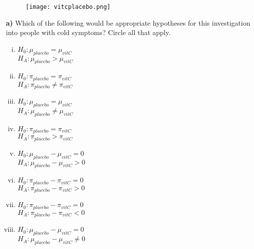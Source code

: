 \documentclass[12pt, oneside]{article}
\newcommand{\noi}{\noindent}
\begin{document}
\begin{figure}[h!]
\centering
\texttt{[image: vitcplacebo.png]}
\end{figure}
\vspace{.05in}

\noi
{\bf a)} Which of the following would be appropriate hypotheses for this investigation into people with cold symptoms? Circle all that apply.\\

\begin{minipage}{2.2in}
\begin{enumerate}[(i)] 
\item $H_0: \mu_{placebo} = \mu_{vitC}$ \\ $H_A: \mu_{placebo} > \mu_{vitC}$
\item $H_0: \pi_{placebo} = \pi_{vitC}$ \\ $H_A: \pi_{placebo} \neq \pi_{vitC}$
\item $H_0: \mu_{placebo} = \mu_{vitC}$ \\ $H_A: \mu_{placebo} \neq \mu_{vitC}$
\end{enumerate}
\end{minipage}
\begin{minipage}{2.5in}
\begin{enumerate} [(i)]
\setcounter{enumi}{3}
\item $H_0: \pi_{placebo} = \pi_{vitC}$ \\ $H_A: \pi_{placebo} > \pi_{vitC}$

\item $H_0: \mu_{placebo} - \mu_{vitC} = 0$ \\ $H_A: \mu_{placebo} - \mu_{vitC} >0$
\item $H_0: \pi_{placebo} - \pi_{vitC} = 0$ \\ $H_A: \pi_{placebo} - \pi_{vitC} >0$
\end{enumerate}
\end{minipage}
\begin{minipage}{2.2in}
\begin{enumerate} [(i)]
\setcounter{enumi}{6}
\item $H_0: \pi_{placebo} - \pi_{vitC} = 0$ \\ $H_A: \pi_{placebo} - \pi_{vitC} < 0$
\item $H_0: \mu_{placebo} - \mu_{vitC} = 0$ \\ $H_A: \mu_{placebo} - \mu_{vitC} \neq 0$
\end{enumerate}
\end{minipage}
\vspace{.2in}
\end{document}
